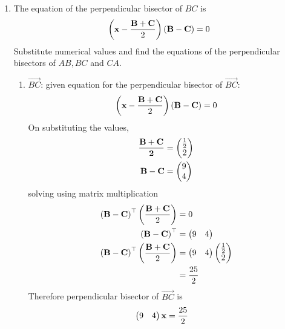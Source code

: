 \documentclass[11pt]{book}
\begin{document}
\begin{enumerate}[label=\thesection.\arabic*.,ref=\thesection.\theenumi]

\item The equation of the perpendicular bisector of $BC$ is
\begin{align}
\label{eq:tri-perp-bisect}
\brak{\vec{x}-\frac{\vec{B}+\vec{C}}{2}}\brak{\vec{B}-\vec{C}} = 0
\end{align}
Substitute numerical values and find the equations of the perpendicular bisectors of $AB, BC$ and $CA$.
\\	\solution
\begin{enumerate}
    \item $\vec{BC}$: given equation for the perpendicular bisector of $\vec{BC}$:
\begin{align}
    \left(\mathbf{x}-\frac{\mathbf{B}+\mathbf{C}}{2}\right)\left(\mathbf{B}-\mathbf{C}\right) = 0
\end{align}
On substituting the values,
\begin{align}
    \mathbf{\frac{\mathbf{B}+\mathbf{C}}{2}} &= \begin{pmatrix}\frac{1}{2} \\ 2\end{pmatrix} \\
\mathbf{B}-\mathbf{C} &= \begin{pmatrix}9 \\ 4\end{pmatrix} \\
\end{align}
solving using matrix multiplication
\begin{align}
\left(\mathbf{B}-\mathbf{C}\right)^{\top}\left(\frac{\mathbf{B}+\mathbf{C}}{2}\right)&=0 \\
\left(\mathbf{B}-\mathbf{C}\right)^{\top} &= \begin{pmatrix}9 & 4\end{pmatrix} \\
\left(\mathbf{B}-\mathbf{C}\right)^{\top}\left(\frac{\mathbf{B}+\mathbf{C}}{2}\right)&=\begin{pmatrix}9 & 4\end{pmatrix}\begin{pmatrix}\frac{1}{2} \\ 2\end{pmatrix}\\
&= \frac{25}{2}
\end{align}
Therefore perpendicular bisector of $\vec{BC}$ is
\begin{align}
    \begin{pmatrix}9 & 4\end{pmatrix}\mathbf{x}&= \frac{25}{2}
\end{align}


\end{enumerate}
\end{enumerate}
\end{document}
